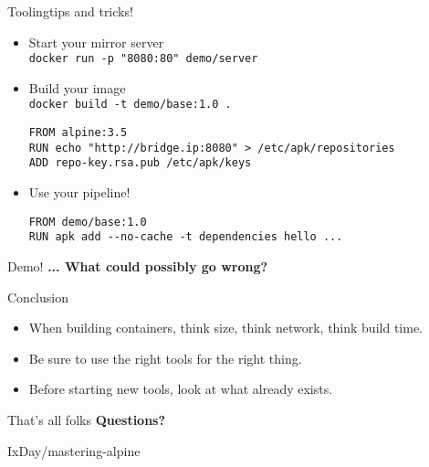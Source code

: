 \documentclass[aspectratio=169]{beamer}
\begin{document}
\begin{frame}[fragile]{Tooling}{tips and tricks!}
  \begin{itemize}
\item Start your mirror server\\
      \texttt{docker run -p "8080:80" demo/server}
    \item Build your image \\ \texttt{docker build -t demo/base:1.0 .}
      \begin{verbatim}
FROM alpine:3.5
RUN echo "http://bridge.ip:8080" > /etc/apk/repositories
ADD repo-key.rsa.pub /etc/apk/keys
      \end{verbatim}

    \item Use your pipeline!
      \begin{verbatim}
FROM demo/base:1.0
RUN apk add --no-cache -t dependencies hello ...
      \end{verbatim}

  \end{itemize}

\end{frame}

\begin{frame}{Demo!}
  \LARGE \textbf{... What could possibly go wrong?}
\end{frame}

\begin{frame}{Conclusion}
  \begin{itemize}
    \item When building containers, think size, think network, think build time.
    \item Be sure to use the right tools for the right thing.
    \item Before starting new tools, look at what already exists.
  \end{itemize}
\end{frame}

\begin{frame}{That's all folks}
  \LARGE \textbf{Questions?}

  \begin{flushright}
    \normalsize \color{Green}IxDay\color{Grey}/mastering-alpine
   \end{flushright}
\end{frame}
\end{document}
